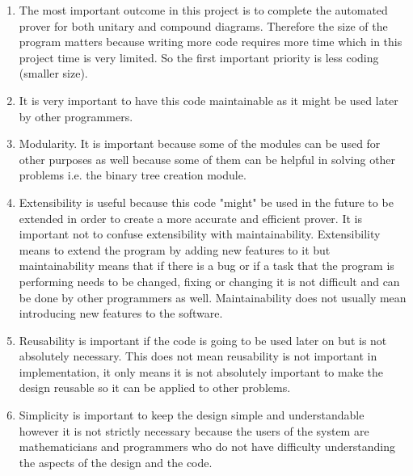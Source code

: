 \documentclass[10pt, a4paper, titlepage]{article}
\begin{document}
\begin{enumerate}
\item The most important outcome in this project is to complete the automated prover for both unitary and compound diagrams. Therefore the size of the program matters because writing more code requires more time which in this project time is very limited. So the first important priority is less coding (smaller size).
\item It is very important to have this code maintainable as it might be used later by other programmers.
\item Modularity. It is important because some of the modules can be used for other purposes as well because some of them can be helpful in solving other problems i.e. the binary tree creation module.
\item Extensibility is useful because this code "might" be used in the future to be extended in order to create a more accurate and efficient prover. It is important not to confuse extensibility with maintainability. Extensibility means to extend the program by adding new features to it but maintainability means that if there is a bug or if a task that the program is performing needs to be changed, fixing or changing it is not difficult and can be done by other programmers as well. Maintainability does not usually mean introducing new features to the software.
\item Reusability is important if the code is going to be used later on but is not absolutely necessary. This does not mean reusability is not important in implementation, it only means it is not absolutely important to make the design reusable so it can be applied to other problems.
\item Simplicity is important to keep the design simple and understandable however it is not strictly necessary because the users of the system are mathematicians and programmers who do not have difficulty understanding the aspects of the design and the code.
\end{enumerate}
\end{document}
